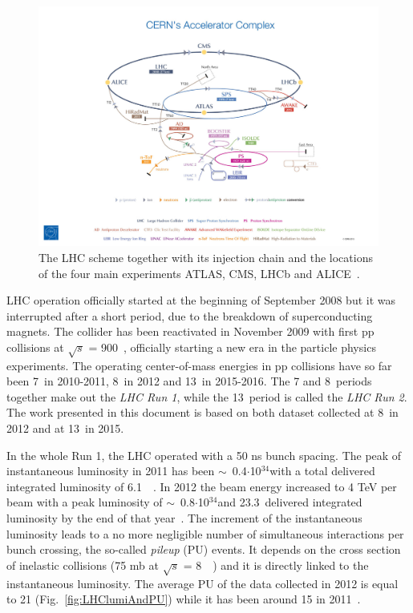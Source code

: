 \begin{figure}[h]
 \begin{center}
  \includegraphics[width=\textwidth]{chapters/Chapter2-CMSatLHC/Figures/LHC2.jpg}
 \end{center}
 \caption{\small The LHC scheme together with its injection chain and the locations of the four main experiments ATLAS, CMS, LHCb and ALICE~\cite{Marcastel:1621583}.}
 \label{fig:LHC}
\end{figure}

LHC operation officially started at the beginning of September 2008 but it was interrupted after a short period, 
due to the breakdown of superconducting magnets. The collider has been reactivated in November 2009 with first pp collisions at $\sqrt{s}$ = 900~\GeV, officially starting a new era in the particle physics experiments. %
The operating center-of-mass energies in pp collisions have so far been 7~\TeV in 2010-2011, 8~\TeV in 2012 and 13~\TeV in 2015-2016. The 7 and 8~\TeV periods together make out the {\itshape LHC Run 1}, while the 13~\TeV period is called the {\itshape LHC Run 2}. The work presented in this document is based on both dataset collected at 8~\TeV in 2012 and at 13~\TeV in 2015.

In the whole Run 1, the LHC operated with a 50 ns bunch spacing.
The peak of instantaneous luminosity in 2011 has been $\sim$~0.4$\cdot$10$^{34}$\percms with a total delivered integrated luminosity of 6.1~\fbinv~\cite{LumiPublicResults}.
In 2012 the beam energy increased to 4 TeV per beam with a peak luminosity of $\sim$~0.8$\cdot$10$^{34}$\percms and 23.3~\fbinv delivered integrated luminosity by the end of that year~\cite{LumiPublicResults}. The increment of the instantaneous luminosity leads to a no more negligible number of simultaneous interactions per bunch crossing, the so-called {\itshape pileup} (PU) events. It depends on the cross section of inelastic collisions (75 mb at $\sqrt{s}$ = 8~\TeV~\cite{Cartiglia:2013vsa}) and it is directly linked to the instantaneous luminosity. The average PU of the data collected in 2012 is equal to 21 (Fig.~\ref{fig:LHClumiAndPU}) while it has been around 15 in 2011~\cite{LumiPublicResults}.

